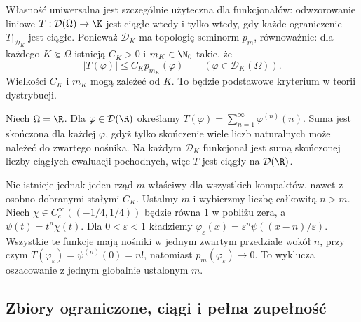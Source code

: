 \begin{uwaga}
\label{rem:D-dual18}
Własność uniwersalna jest szczególnie użyteczna dla
funkcjonałów: odwzorowanie liniowe $T:\mathcal D(\Omega)\to\K$
jest ciągłe wtedy i tylko wtedy, gdy każde ograniczenie
$T|_{\mathcal D_K}$ jest ciągłe. Ponieważ $\mathcal D_K$
ma topologię seminorm $p_m$, równoważnie: dla każdego
$K\Subset\Omega$ istnieją $C_K>0$ i $m_K\in\N_0$ takie, że
\[
 |T(\varphi)|\le C_K p_{m_K}(\varphi)
 \qquad(\varphi\in\mathcal D_K(\Omega)).
\]
Wielkości $C_K$ i $m_K$ mogą zależeć od $K$.
To będzie podstawowe kryterium w teorii dystrybucji.
\end{uwaga}


\begin{przyklad}
\label{ex:variable-order18}
Niech $\Omega=\R$. Dla $\varphi\in\mathcal D(\R)$ określamy
$T(\varphi)=\sum_{n=1}^\infty \varphi^{(n)}(n)$.
Suma jest skończona dla każdej $\varphi$, gdyż tylko skończenie
wiele liczb naturalnych może należeć do zwartego nośnika.
Na każdym $\mathcal D_K$ funkcjonał jest sumą skończonej
liczby ciągłych ewaluacji pochodnych, więc $T$ jest ciągły
na $\mathcal D(\R)$.

Nie istnieje jednak jeden rząd $m$ właściwy dla wszystkich
kompaktów, nawet z osobno dobranymi stałymi $C_K$.
Ustalmy $m$ i wybierzmy liczbę całkowitą $n>m$.
Niech $\chi\in C_c^\infty((-1/4,1/4))$ będzie równa $1$
w pobliżu zera, a $\psi(t)=t^n\chi(t)$. Dla $0<\varepsilon<1$
kładziemy $\varphi_\varepsilon(x)=\varepsilon^n
\psi((x-n)/\varepsilon)$. Wszystkie te funkcje mają
nośniki w jednym zwartym przedziale wokół $n$, przy czym
$T(\varphi_\varepsilon)=\psi^{(n)}(0)=n!$,
natomiast $p_m(\varphi_\varepsilon)\to0$.
To wyklucza oszacowanie z jednym globalnie ustalonym $m$.
\end{przyklad}

\subsection{Zbiory ograniczone, ciągi i pełna zupełność}

